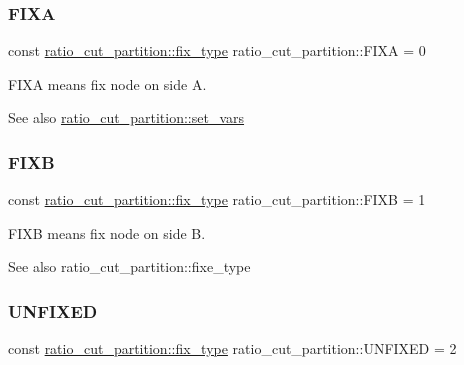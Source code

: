 \subsubsection{\texorpdfstring{F\+I\+XA}{FIXA}}
{\footnotesize\ttfamily const \mbox{\hyperlink{classratio__cut__partition_a558dda40abda8ab03edb4605dbb81e36}{ratio\+\_\+cut\+\_\+partition\+::fix\+\_\+type}} ratio\+\_\+cut\+\_\+partition\+::\+F\+I\+XA = 0\hspace{0.3cm}{\ttfamily [static]}}

{\ttfamily F\+I\+XA} means fix node on side {\ttfamily A}.

\begin{DoxySeeAlso}{See also}
\mbox{\hyperlink{classratio__cut__partition_a4c143f82aac5fee3b955414ab7d6ce19}{ratio\+\_\+cut\+\_\+partition\+::set\+\_\+vars}} 
\end{DoxySeeAlso}
\mbox{\label{classratio__cut__partition_aea621a2460229773cbc095814942963a}} 
\subsubsection{\texorpdfstring{F\+I\+XB}{FIXB}}
{\footnotesize\ttfamily const \mbox{\hyperlink{classratio__cut__partition_a558dda40abda8ab03edb4605dbb81e36}{ratio\+\_\+cut\+\_\+partition\+::fix\+\_\+type}} ratio\+\_\+cut\+\_\+partition\+::\+F\+I\+XB = 1\hspace{0.3cm}{\ttfamily [static]}}

{\ttfamily F\+I\+XB} means fix node on side {\ttfamily B}.

\begin{DoxySeeAlso}{See also}
ratio\+\_\+cut\+\_\+partition\+::fixe\+\_\+type 
\end{DoxySeeAlso}
\mbox{\label{classratio__cut__partition_a153cc7e51ac5d72a00671b6bdbcc6fa5}} 
\subsubsection{\texorpdfstring{U\+N\+F\+I\+X\+ED}{UNFIXED}}
{\footnotesize\ttfamily const \mbox{\hyperlink{classratio__cut__partition_a558dda40abda8ab03edb4605dbb81e36}{ratio\+\_\+cut\+\_\+partition\+::fix\+\_\+type}} ratio\+\_\+cut\+\_\+partition\+::\+U\+N\+F\+I\+X\+ED = 2\hspace{0.3cm}{\ttfamily [static]}}

